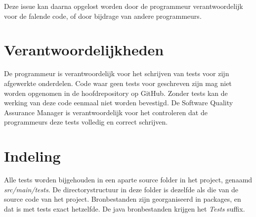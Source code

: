 Deze issue kan daarna opgelost worden door de programmeur verantwoordelijk voor de falende code, of door bijdrage van andere programmeurs.

\section{Verantwoordelijkheden}
De programmeur is verantwoordelijk voor het schrijven van tests voor zijn afgewerkte onderdelen. Code waar geen tests voor geschreven zijn mag niet worden opgenomen in de hoofdrepository op GitHub. Zonder tests kan de werking van deze code eenmaal niet worden bevestigd. De Software Quality Assurance Manager is verantwoordelijk voor het controleren dat de programmeurs deze tests volledig en correct schrijven.

\section{Indeling}
Alle tests worden bijgehouden in een aparte source folder in het project, genaamd \emph{src/main/tests}.
De directorystructuur in deze folder is dezelfde als die van de source code van het project.
Bronbestanden zijn georganiseerd in packages, en dat is met tests exact hetzelfde.
De java bronbestanden krijgen het \emph{Tests} suffix.

